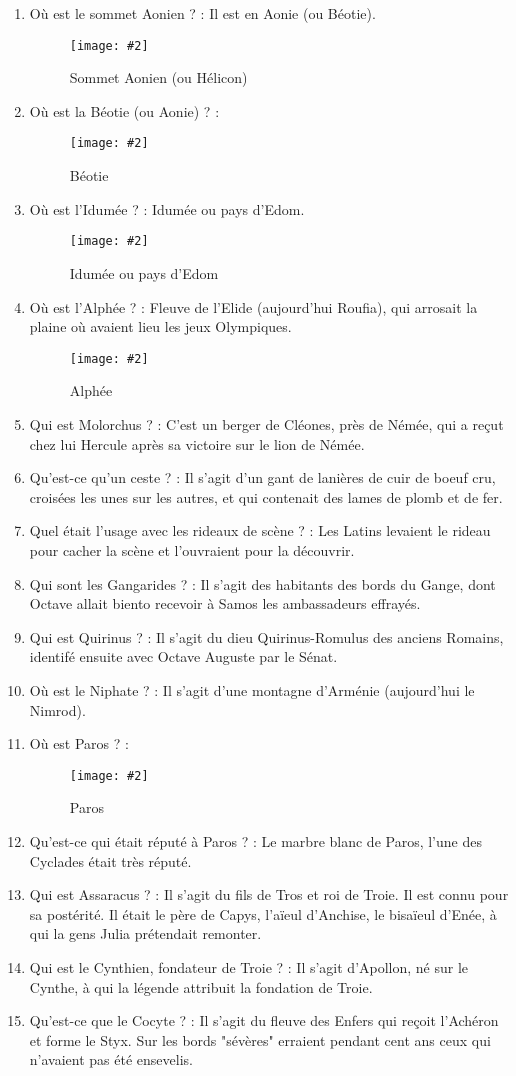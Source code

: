 \documentclass[a4paper, 11pt, hidelinks]{article}
\newcommand{\img}[4]{\begin{figure}[!ht]
    \centering
    \texttt{[image: \#2]}
    \caption{#3}
    \label{#4}
    \end{figure} }
\begin{document}
\begin{enumerate}
      \item Où est le sommet Aonien ? : Il est en Aonie (ou Béotie).
            \img{0.4}{Aonien.png}{Sommet Aonien (ou Hélicon)}{111}
            \newpage
      \item Où est la Béotie (ou Aonie) ? :
            \img{0.5}{Béotie.png}{Béotie}{112}
      \item Où est l'Idumée ? : Idumée ou pays d'Edom.
            \img{0.5}{Idumée.png}{Idumée ou pays d'Edom}{113}
      \item Où est l'Alphée ? : Fleuve de l'Elide (aujourd'hui Roufia), qui arrosait la plaine où avaient lieu les jeux Olympiques.
            \img{0.5}{Alphée.png}{Alphée}{114}
            \newpage
      \item Qui est Molorchus ? : C'est un berger de Cléones, près de Némée, qui a reçut chez lui Hercule après sa victoire sur le lion de Némée.
      \item Qu'est-ce qu'un ceste ? : Il s'agit d'un gant de lanières de cuir de boeuf cru, croisées les unes sur les autres, et qui contenait des lames de plomb et de fer.
      \item Quel était l'usage avec les rideaux de scène ? : Les Latins levaient le rideau pour cacher la scène et l'ouvraient pour la découvrir.
      \item Qui sont les Gangarides ? : Il s'agit des habitants des bords du Gange, dont Octave allait biento recevoir à Samos les ambassadeurs effrayés.
      \item Qui est Quirinus ? : Il s'agit du dieu Quirinus-Romulus des anciens Romains, identifé ensuite avec Octave Auguste par le Sénat.
      \item Où est le Niphate ? : Il s'agit d'une montagne d'Arménie (aujourd'hui le Nimrod).
      \item Où est Paros ? :
            \img{0.4}{Paros.png}{Paros}{115}
      \item Qu'est-ce qui était réputé à Paros ? : Le marbre blanc de Paros, l'une des Cyclades était très réputé.
      \item Qui est Assaracus ? : Il s'agit du fils de Tros et roi de Troie. Il est connu pour sa postérité. Il était le père de Capys, l'aïeul d'Anchise, le bisaïeul d'Enée, à qui 
            la gens Julia prétendait remonter.
      \item Qui est le Cynthien, fondateur de Troie ? : Il s'agit d'Apollon, né sur le Cynthe, à qui la légende attribuit la fondation de Troie.
      \item Qu'est-ce que le Cocyte ? : Il s'agit du fleuve des Enfers qui reçoit l'Achéron et forme le Styx. Sur les bords "sévères" erraient pendant cent ans ceux qui n'avaient pas été ensevelis.

\end{enumerate}
\end{document}
